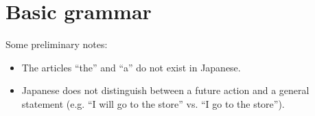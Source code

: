 \documentclass[../nihongo-gakushuu-kyouzai.tex]{subfiles}
\begin{document}
\section{Basic grammar}
Some preliminary notes:
\begin{itemize}
    \item The articles ``the'' and ``a'' do not exist in Japanese.
    \item Japanese does not distinguish between a future action and a general statement (e.g. ``I
    will go to the store'' vs. ``I go to the store'').
\end{itemize}
\end{document}
